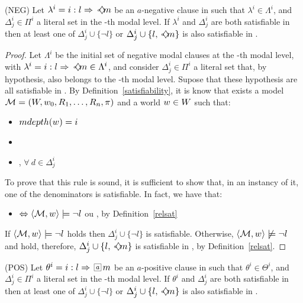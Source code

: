 \begin{lemma}{(NEG)} Let $\lambda^i = \cneg$ be an $a$-negative clause in 
    such that $\lambda^i \in \Lambda^i$, and $\Delta^i_j \in \Pi^i$ a literal
    set in the \ml-th modal level. If $\lambda^i$ and $\Delta^i_j$ are both
    satisfiable in  then at least one of $\Delta^i_j \cup
    \{\neg l\}$ or $\Delta^i_j \cup \{l, \pos{a}m\}$ is also satisfiable in
    .
\end{lemma}
\begin{proof}
   Let $\Lambda^i$ be the initial set of negative modal clauses at the \ml-th
   modal level, with $\lambda^i = \cneg \in \Lambda^i$, and consider $\Delta^i_j
   \in \Pi^i$ a literal set that, by hypothesis, also belongs to the \ml-th
   modal level. Supose that these hypothesis are all satisfiable in
   . By Definition~\ref{satisfiability}, it is know that exists a
   model $\Model = (W, \st_0, R_1, \ldots, R_n, \pi)$ and a world $\st \in W$
   such that:
   \begin{itemize}
       \item $mdepth(w) = \ml$ 
       \item {}
       \item {}, $\forall~d \in \Delta^i_j$
   \end{itemize}
   To prove that this rule is sound, it is sufficient to show that, in an
   instancy of it, one of the denominators is satisfiable. In fact, we have
   that:
   \begin{itemize}
       \item {} $\iff \sat{\Model}{\st}{\neg
           l}$ ou , by Definition~\ref{relsat}
   \end{itemize}
   If $\sat{\Model}{\st}{\neg l}$ holds then $\Delta^i_j \cup \{\neg l\}$ is
   satisfiable. Otherwise, $\langle \Model, \st \rangle \not \models \neg l$ and
    hold, therefore, $\Delta^i_j \cup \{l, \pos{a}
   m\}$ is satisfiable in , by Definition~\ref{relsat}. 
\end{proof}

\begin{lemma}{(POS)} Let $\theta^i = \cpos$ be an $a$-positive clause in 
    such that $\theta^i \in \Theta^i$, and $\Delta^i_j \in \Pi^i$ a literal
    set in the \ml-th modal level. If $\theta^i$ and $\Delta^i_j$ are both
    satisfiable in  then at least one of $\Delta^i_j \cup
    \{\neg l\}$ or $\Delta^i_j \cup \{l, \pos{a}m\}$ is also satisfiable in
    .
\end{lemma}


